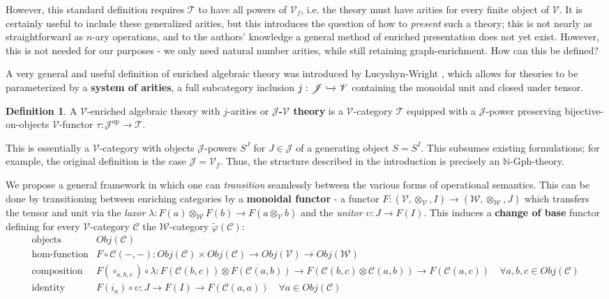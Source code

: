 \documentclass[a4paper,UKenglish]{article}
\theoremstyle{definition}
\newtheorem{definition}{Definition}[section]
\newcommand{\Gph}{\mathrm{Gph}}
\newcommand{\op}{\mathrm{op}}
\newcommand{\NN}{\mathbb{N}}
\newcommand{\V}{\mathscr{V}}
\newcommand{\W}{\mathscr{W}}
\newcommand{\C}{\mathscr{C}}
\newcommand{\T}{\mathscr{T}}
\newcommand{\J}{\mathscr{J}}
\begin{document}
However, this standard definition requires $\T$ to have all powers of $\V_f$, i.e. the theory must have arities for every finite object of $\V$. It is certainly useful to include these generalized arities, but this introduces the question of how to \textit{present} such a theory; this is not nearly as straightforward as $n$-ary operations, and to the authors' knowledge a general method of enriched presentation does not yet exist. However, this is not needed for our purposes - we only need natural number arities, while still retaining graph-enrichment. How can this be defined?

A very general and useful definition of enriched algebraic theory was introduced by Lucyshyn-Wright \cite{rbb}, which allows for theories to be parameterized by a \textbf{system of arities}, a full subcategory inclusion $j: \J \xhookrightarrow{} \V$ containing the monoidal unit and closed under tensor.

\theoremstyle{definition}
\begin{definition} A $\V$-enriched algebraic theory with $j$-arities or \textbf{$\J$-$\V$ theory} is a $\V$-category $\T$ equipped with a $\J$-power preserving bijective-on-objects $\V$-functor $\tau:\J^\op \to \T$.
\end{definition}

This is essentially a $\V$-category with objects $\J$-powers $S^J$ for $J \in \J$ of a generating object $S = S^I$. This subsumes existing formulations; for example, the original definition is the case $\J = \V_f$. Thus, the structure described in the introduction is precisely an $\NN$-$\Gph$-theory.



We propose a general framework in which one can \textit{transition} seamlessly between the various forms of operational semantics. This can be done by transitioning between enriching categories by a \textbf{monoidal functor} - a functor $F: (\V,\otimes_\V,I) \to (\W,\otimes_\W,J)$ which transfers the tensor and unit via the \textit{laxor} $\lambda: F(a) \otimes_\W F(b) \to F(a\otimes_\V b)$ and the \textit{unitor} $\upsilon: J \to F(I)$. This induces a \textbf{change of base} functor \cite{borceux} defining for every $\V$-category $\C$ the $\W$-category $\widetilde{\varphi}(\C)$:
\[\begin{array}{rl}
\text{objects} & Obj(\C)\\
\text{hom-function} & F \circ \C(-,-):Obj(\C) \times Obj(\C) \to Obj(\V) \to Obj(\W)\\
\text{composition} & F(\circ_{a,b,c}) \circ \lambda:F(\C(b,c)) \otimes F(\C(a,b)) \to F(\C(b,c) \otimes \C(a,b)) \to F(\C(a,c)) \quad \forall a,b,c \in Obj(\C)\\
\text{identity} & F(i_a) \circ \upsilon: J \to F(I) \to F(\C(a,a)) \quad \forall a \in Obj(\C)\\
\end{array}\]
\end{document}
